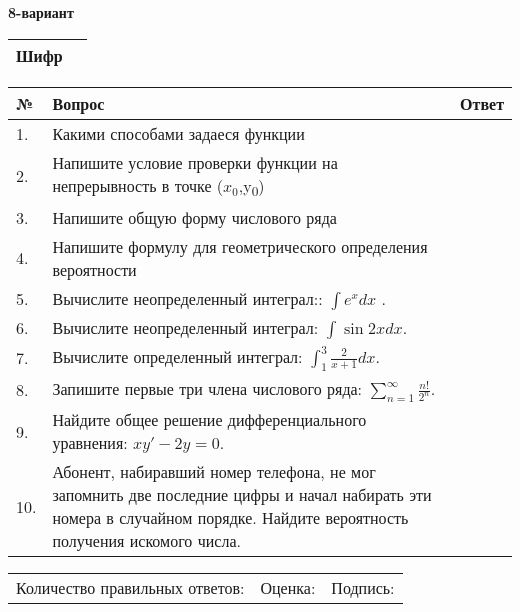 \documentclass{article}
\begin{document}
  \egroup
  
  \newpage
  
  
  \textbf{8-вариант}\\
  
  \bgroup
  \def\arraystretch{1.6} %
  
  \begin{tabular}{|m{5.7cm}|m{9.5cm}|}
  \hline
  Шифр & \\
  \hline
  \end{tabular}
  
  \vspace{1cm}
  
  \begin{tabular}{|m{0.7cm}|m{10cm}|m{4cm}|}
  \hline
  № & Вопрос & Ответ \\
  \hline
  1. & Какими способами задаеся функции &  \\
  \hline
  2. & Напишите условие проверки функции на непрерывность в точке (\(x_{0}\),y\textsubscript{0}) &  \\
  \hline
  3. & Напишите общую форму числового ряда &  \\
  \hline
  4. & Напишите формулу для геометрического определения вероятности &  \\
  \hline
  5. & Вычислите неопределенный интеграл:: \(\int{e^{x}dx}\) . &  \\
  \hline
  6. & Вычислите неопределенный интеграл: \(\int{\sin{2x}dx}\). &  \\
  \hline
  7. & Вычислите определенный интеграл: \(\int_{1}^{3}{\frac{2}{x + 1}dx}\). &  \\
  \hline
  8. & Запишите первые три члена числового ряда: \(\sum_{n = 1}^{\infty}\frac{n!}{2^{n}}\). &  \\
  \hline
  9. & Найдите общее решение дифференциального уравнения: \(xy' - 2y = 0\). &  \\
  \hline
  10. & Абонент, набиравший номер телефона, не мог запомнить две последние цифры и начал набирать эти номера в случайном порядке. Найдите вероятность получения искомого числа. &  \\
  \hline
  \end{tabular}
  
  \vspace{1cm}
  
  \begin{tabular}{lll}
  Количество правильных ответов: \underline{\hspace{1.5cm}} & 
  Оценка: \underline{\hspace{1.5cm}} & 
  Подпись: \underline{\hspace{2cm}} \\
  \end{tabular}
  
\end{document}
